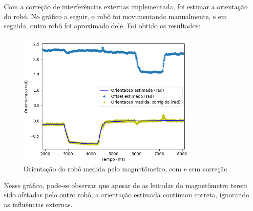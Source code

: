 \documentclass[
	12pt,				%
	openright,			%
	twoside,			%
	convert,
	a4paper,			%
	english,			%
	french,				%
	spanish,			%
	brazil				%
	]{abntex2}
\begin{document}
Com a correção de interferências externas implementada, foi estimar a orientação do robô. No gráfico a seguir, o robô foi movimentando manualmente, e em seguida, outro robô foi aproximado dele. Foi obtido os resultados:
\begin{figure}[H]
	\caption{Orientação do robô medida pelo magnetômetro, com e sem correção}
\begin{center}
   \includegraphics[width=0.8\textwidth]{mag_offset_fix}
\end{center}
\end{figure}
Nesse gráfico, pode-se observar que apesar de as leitudas do magnetômetro terem sido afetadas pelo outro robô, a orientação estimada continuou correta, ignorando as influências externas.
\end{document}
